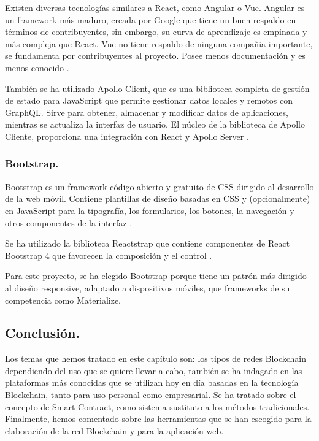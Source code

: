 \vspace{5mm}

\noindent Existen diversas tecnologías similares a React, como Angular o Vue. Angular es un framework más maduro, 
creada por Google que tiene un buen respaldo en términos de contribuyentes, sin embargo, su curva de aprendizaje es 
empinada y más compleja que React. Vue no tiene respaldo de ninguna compañia importante, se fundamenta por 
contribuyentes al proyecto. Posee menos documentación y es menos conocido \cite{angular-react-vue}. 

\vspace{5mm}

\noindent También se ha utilizado Apollo Client, que es una biblioteca completa de gestión de estado para JavaScript 
que permite gestionar datos locales y remotos con GraphQL. Sirve para obtener, almacenar y modificar datos de 
aplicaciones, mientras se actualiza la interfaz de usuario. El núcleo de la biblioteca de Apollo Cliente, proporciona 
una integración con React y Apollo Server \cite{introduction-apollo-client}.

\subsubsection*{Bootstrap.}

Bootstrap es un framework código abierto y gratuito de CSS dirigido al desarrollo de la web móvil. Contiene 
plantillas de diseño basadas en CSS y (opcionalmente) en JavaScript para la tipografía, los formularios, los botones, 
la navegación y otros componentes de la interfaz \cite{bootstrap}.

\vspace{5mm}

\noindent Se ha utilizado la biblioteca Reactstrap que contiene componentes de React Bootstrap 4 que favorecen la 
composición y el control \cite{reactstrap}.

\vspace{5mm}

\noindent Para este proyecto, se ha elegido Bootstrap porque tiene un patrón más dirigido al diseño responsive, 
adaptado a dispositivos móviles, que frameworks de su competencia como Materialize.

\subsection{Conclusión.}

Los temas que hemos tratado en este capítulo son: los tipos de redes Blockchain dependiendo del uso que se quiere 
llevar a cabo, también se ha indagado en las plataformas más conocidas que se utilizan hoy en día basadas en la 
tecnología Blockchain, tanto para uso personal como empresarial. Se ha tratado sobre el concepto de Smart Contract, 
como sistema sustituto a los métodos tradicionales. Finalmente, hemos comentado sobre las herramientas que se han 
escogido para la elaboración de la red Blockchain y para la aplicación web.